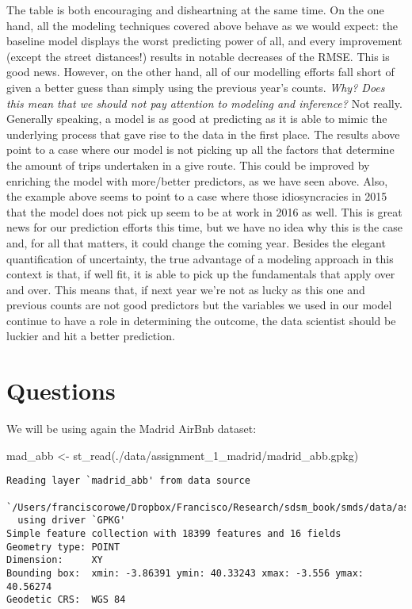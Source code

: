 \documentclass[
  letterpaper,
  krantz2]{style/krantz}
\newenvironment{Shaded}{\begin{snugshade}}{\end{snugshade}}
\newcommand{\FunctionTok}[1]{\textcolor[rgb]{0.28,0.35,0.67}{#1}}
\newcommand{\NormalTok}[1]{\textcolor[rgb]{0.00,0.23,0.31}{#1}}
\newcommand{\OtherTok}[1]{\textcolor[rgb]{0.00,0.23,0.31}{#1}}
\newcommand{\StringTok}[1]{\textcolor[rgb]{0.13,0.47,0.30}{#1}}
\begin{document}
The table is both encouraging and disheartning at the same time. On the
one hand, all the modeling techniques covered above behave as we would
expect: the baseline model displays the worst predicting power of all,
and every improvement (except the street distances!) results in notable
decreases of the RMSE. This is good news. However, on the other hand,
all of our modelling efforts fall short of given a better guess than
simply using the previous year's counts. \emph{Why? Does this mean that
we should not pay attention to modeling and inference?} Not really.
Generally speaking, a model is as good at predicting as it is able to
mimic the underlying process that gave rise to the data in the first
place. The results above point to a case where our model is not picking
up all the factors that determine the amount of trips undertaken in a
give route. This could be improved by enriching the model with
more/better predictors, as we have seen above. Also, the example above
seems to point to a case where those idiosyncracies in 2015 that the
model does not pick up seem to be at work in 2016 as well. This is great
news for our prediction efforts this time, but we have no idea why this
is the case and, for all that matters, it could change the coming year.
Besides the elegant quantification of uncertainty, the true advantage of
a modeling approach in this context is that, if well fit, it is able to
pick up the fundamentals that apply over and over. This means that, if
next year we're not as lucky as this one and previous counts are not
good predictors but the variables we used in our model continue to have
a role in determining the outcome, the data scientist should be luckier
and hit a better prediction.

\hypertarget{questions-1}{%
\section{Questions}\label{questions-1}}

We will be using again the Madrid AirBnb dataset:

\begin{Shaded}
\begin{Highlighting}[]
\NormalTok{mad\_abb }\OtherTok{\textless{}{-}} \FunctionTok{st\_read}\NormalTok{(}\StringTok{\textquotesingle{}./data/assignment\_1\_madrid/madrid\_abb.gpkg\textquotesingle{}}\NormalTok{)}
\end{Highlighting}
\end{Shaded}

\begin{verbatim}
Reading layer `madrid_abb' from data source 
  `/Users/franciscorowe/Dropbox/Francisco/Research/sdsm_book/smds/data/assignment_1_madrid/madrid_abb.gpkg' 
  using driver `GPKG'
Simple feature collection with 18399 features and 16 fields
Geometry type: POINT
Dimension:     XY
Bounding box:  xmin: -3.86391 ymin: 40.33243 xmax: -3.556 ymax: 40.56274
Geodetic CRS:  WGS 84
\end{verbatim}
\end{document}
